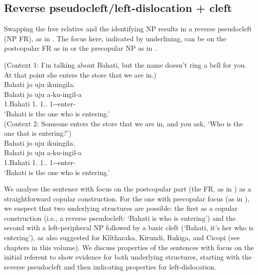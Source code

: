 \documentclass[output=paper]{langscibook}
\begin{document}
\subsection{Reverse pseudocleft/left-dislocation + cleft}
\label{bkm:Ref98081626}\label{bkm:Ref122079499}
Swapping the free relative and the identifying NP results in a reverse pseudocleft (NP \COP{} FR), as in . The focus here, indicated by underlining, can be on the postcopular FR as in  or the precopular NP as in .

\ea
\label{bkm:Ref98085466}
\ea
\label{bkm:Ref98085466:a}
(Context 1: I’m talking about Bahati, but the name doesn’t ring a bell for you. At that point she enters the store that we are in.)\\
Bahati jo uju ikuingila.\\
\gll
Bahati  jo  uju  a-ku-ingil-a\\
1.Bahati  1.\IDCOP{}  1.\DEM.\PROX{}  1\SM-\PRS{}-enter-\FV{}\\
\glt
‘Bahati is the one who is entering.’\\

\ex
\label{bkm:Ref98085466:b}
(Context 2: Someone enters the store that we are in, and you ask, ‘Who is the one that is entering?’)\\
Bahati jo uju ikuingila.\\
\gll
Bahati  jo  uju  a-ku-ingil-a\\
1.Bahati  1.\IDCOP{}  1.\DEM.\PROX{}  1\SM-\PRS{}-enter-\FV{}\\
\glt
‘Bahati is the one who is entering.’\\

\z
\z

We analyse the sentence with focus on the postcopular part (the FR, as in ) as a straightforward copular construction. For the one with precopular focus (as in ), we suspect that two underlying structures are possible: the first as a copular construction (i.e., a reverse pseudocleft: ‘Bahati is who is entering’) and the second with a left-peripheral NP followed by a basic cleft (‘Bahati, it’s her who is entering’), as also suggested for Kîîtharaka, Kirundi, Rukiga, and Cicopi (see chapters in this volume). We discuss properties of the sentences with focus on the initial referent to show evidence for both underlying structures, starting with the reverse pseudocleft and then indicating properties for left-dislocation.
\end{document}
